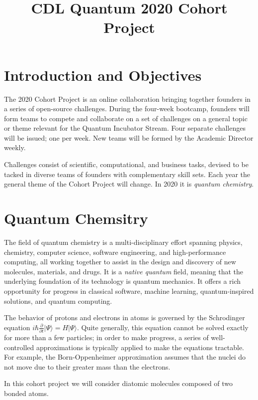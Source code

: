 \documentclass[12pt]{article}
\title{CDL Quantum 2020 Cohort Project}
\begin{document}
\maketitle

\thispagestyle{empty}
\section*{Introduction and Objectives}

The 2020 Cohort Project is an online collaboration bringing together founders in a series of open-source challenges.
During the four-week bootcamp, founders will form teams to compete and collaborate on a set of challenges on a general topic or theme
relevant for the Quantum Incubator Stream.  Four separate challenges will be issued; one per week.  New teams will be formed by the Academic Director weekly.

Challenges consist of scientific, computational, and business tasks, devised to be tacked in diverse teams of founders with complementary skill sets.  Each year
the general theme of the Cohort Project will change.  In 2020 it is {\it quantum chemistry}.


\section*{Quantum Chemsitry}

The field of quantum chemistry is a multi-disciplinary effort spanning physics, chemistry, computer science, software engineering, and high-performance computing,
all working together to assist in the design and discovery of new molecules, materials, and drugs.  It is a {\it native quantum} field, meaning that the underlying
foundation of its technology is quantum mechanics. It offers a rich opportunity for progress in classical software, machine learning, quantum-inspired solutions,
and quantum computing.

The behavior of protons and electrons in atoms is governed by the Schrodinger equation $i \hbar \frac{\partial }{ \partial t}  | \Psi \rangle = H | \Psi \rangle$.
Quite generally, this equation cannot be solved exactly for more than a few particles; in order to make progress, a series of well-controlled approximations is 
typically applied to make the equations tractable.  For example, the Born-Oppenheimer approximation assumes that the nuclei do not move due to their 
greater mass than the electrons.  

In this cohort project we will consider diatomic molecules composed of two bonded atoms.
 
\end{document}

